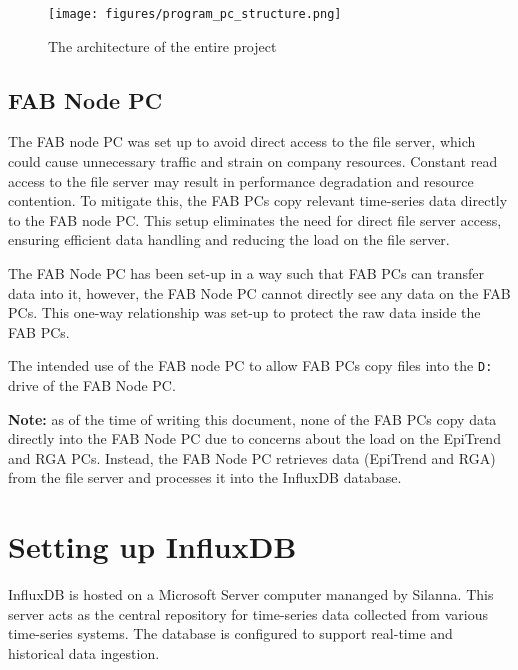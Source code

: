 \documentclass{article}
\begin{document}
\begin{figure}[h]
    \centering
    \texttt{[image: figures/program\_pc\_structure.png]}
    \caption{The architecture of the entire project}
    \label{fig:program_pc_structure}
\end{figure}

\subsection{FAB Node PC}

The FAB node PC was set up to avoid direct access to the file server, which could cause unnecessary traffic and strain on company resources. Constant read access to the file server may result in performance degradation and resource contention. To mitigate this, the FAB PCs copy relevant time-series data directly to the FAB node PC. This setup eliminates the need for direct file server access, ensuring efficient data handling and reducing the load on the file server.

\vspace{5pt}
\noindent
The FAB Node PC has been set-up in a way such that FAB PCs can transfer data into it, however, the FAB Node PC cannot directly see any data on the FAB PCs. This one-way relationship was set-up to protect the raw data inside the FAB PCs.

\vspace{5pt}
\noindent
The intended use of the FAB node PC to allow FAB PCs copy files into the \texttt{D:} drive of the FAB Node PC. 

\vspace{5pt}
\noindent
\textbf{Note:} as of the time of writing this document, none of the FAB PCs copy data directly into the FAB Node PC due to concerns about the load on the EpiTrend and RGA PCs. Instead, the FAB Node PC retrieves data (EpiTrend and RGA) from the file server and processes it into the InfluxDB database.





\section{Setting up InfluxDB}
\label{sec:Setting_up_InfluxDB}
InfluxDB is hosted on a Microsoft Server computer mananged by Silanna. This server acts as the central repository for time-series data collected from various time-series systems. The database is configured to support real-time and historical data ingestion.
\end{document}
